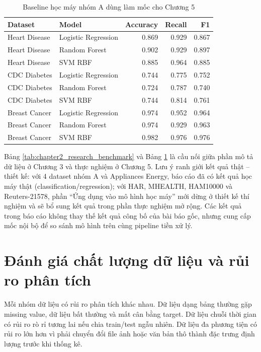 \begin{table}[H]
\centering
\caption{Baseline học máy nhóm A dùng làm mốc cho Chương 5}
\label{tab:chapter2_ml_preview}
\small
\begin{tabular}{llrrr}
\toprule
Dataset & Model & Accuracy & Recall & F1 \\
\midrule
Heart Disease & Logistic Regression & 0.869 & 0.929 & 0.867 \\
Heart Disease & Random Forest & 0.902 & 0.929 & 0.897 \\
Heart Disease & SVM RBF & 0.885 & 0.964 & 0.885 \\
CDC Diabetes & Logistic Regression & 0.744 & 0.775 & 0.752 \\
CDC Diabetes & Random Forest & 0.724 & 0.787 & 0.740 \\
CDC Diabetes & SVM RBF & 0.744 & 0.814 & 0.761 \\
Breast Cancer & Logistic Regression & 0.974 & 0.952 & 0.964 \\
Breast Cancer & Random Forest & 0.974 & 0.929 & 0.963 \\
Breast Cancer & SVM RBF & 0.982 & 0.976 & 0.976 \\
\bottomrule
\end{tabular}
\end{table}

Bảng \ref{tab:chapter2_research_benchmark} và Bảng \ref{tab:chapter2_ml_preview} là cầu nối giữa phần mô tả dữ liệu ở Chương 3 và thực nghiệm ở Chương 5. Lưu ý ranh giới kết quả thật -- thiết kế: với 4 dataset nhóm A và Appliances Energy, báo cáo đã có kết quả học máy thật (classification/regression); với HAR, MHEALTH, HAM10000 và Reuters-21578, phần ``Ứng dụng vào mô hình học máy'' mới dừng ở thiết kế thí nghiệm và sẽ bổ sung kết quả trong phần thực nghiệm mở rộng. Các kết quả trong báo cáo không thay thế kết quả công bố của bài báo gốc, nhưng cung cấp mốc nội bộ để so sánh mô hình trên cùng pipeline tiền xử lý.


\section{Đánh giá chất lượng dữ liệu và rủi ro phân tích}

Mỗi nhóm dữ liệu có rủi ro phân tích khác nhau. Dữ liệu dạng bảng thường gặp missing value, dữ liệu bất thường và mất cân bằng target. Dữ liệu chuỗi thời gian có rủi ro rò rỉ tương lai nếu chia train/test ngẫu nhiên. Dữ liệu đa phương tiện có rủi ro lớn hơn vì phải chuyển đổi file ảnh hoặc văn bản thô thành đặc trưng định lượng trước khi thống kê.

